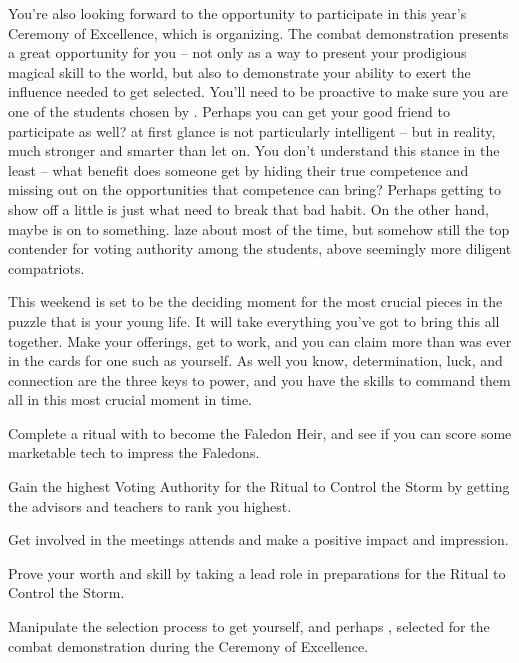 \documentclass[char]{GL2020}
\begin{document}
You're also looking forward to the opportunity to participate in this year's Ceremony of Excellence, which \cMusic{\full} is organizing. The combat demonstration presents a great opportunity for you – not only as a way to present your prodigious magical skill to the world, but also to demonstrate your ability to exert the influence needed to get selected. You'll need to be proactive to make sure you are one of the students chosen by \cMusic{}. Perhaps you can get your good friend \cChupStudent{\full} to participate as well? \cChupStudent{} at first glance is not particularly intelligent -- but in reality, \cChupStudent{\they} \cChupStudent{\are} much stronger and smarter than \cChupStudent{\they} let\cChupStudent{\plural} on. You don't  understand this stance in the least -- what benefit does someone get by hiding their true competence and missing out on the opportunities that competence can bring? Perhaps getting \cChupStudent{\them} to show off a little is just what \cChupStudent{\they} need\cChupStudent{\plural} to break that bad habit. On the other hand, maybe \cChupStudent{} is on to something. \cChupStudent{\They} laze\cChupStudent{\plural} about most of the time, but somehow \cChupStudent{\are} still the top contender for voting authority among the \pFarm{} students, above \cChupStudent{\their} seemingly more diligent compatriots.

This weekend is set to be the deciding moment for the most crucial pieces in the puzzle that is your young life. It will take everything you've got to bring this all together. Make your offerings, get to work, and you can claim more than was ever in the cards for one such as yourself. As well you know, determination, luck, and connection are the three keys to power, and you have the skills to command them all in this most crucial moment in time.

\begin{itemz}
	\item Complete a ritual with \cHeir{} to become the Faledon Heir, and see if you can score some marketable tech to impress the Faledons.
	\item Gain the highest Voting Authority for the Ritual to Control the Storm by getting the \pTech{} advisors and \pShip{} teachers to rank you highest.
	\item Get involved in the meetings \cDiplomat{} attends and make a positive impact and impression.
	\item Prove your worth and skill by taking a lead role in preparations for the Ritual to Control the Storm.
	\item Manipulate the selection process to get yourself, and perhaps \cChupStudent{}, selected for the combat demonstration during the Ceremony of Excellence.
\end{itemz}
\end{document}
